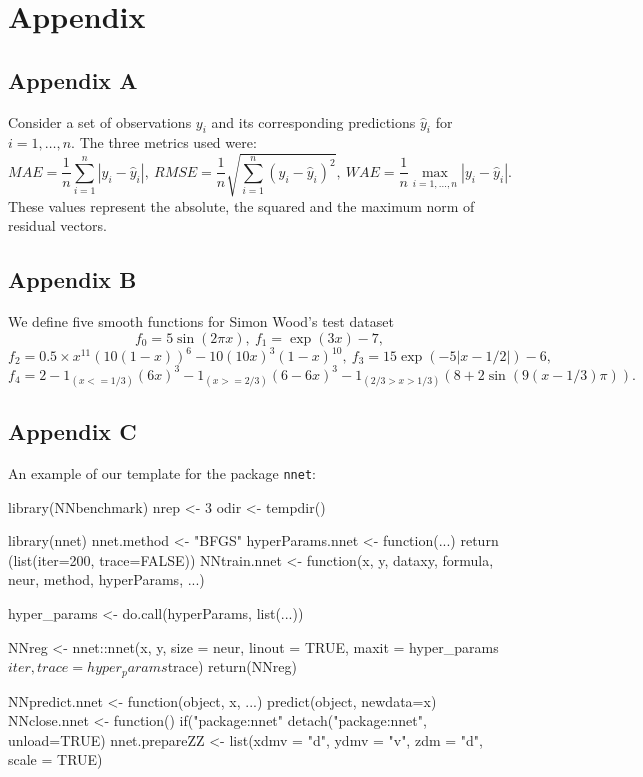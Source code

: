 

\hypertarget{appendix}{%
\section{Appendix}\label{appendix}}

\hypertarget{appendix-a}{%
\subsection{Appendix A}\label{appendix-a}}

Consider a set of observations \(y_i\) and its corresponding predictions
\(\hat y_i\) for \(i=1,\dots,n\). The three metrics used were: \[
MAE = \frac1n\sum_{i=1}^n|y_i - \hat y_i|,~
RMSE = \frac1n\sqrt{\sum_{i=1}^n(y_i - \hat y_i)^2},~
WAE = \frac1n\max_{i=1,\dots,n}|y_i - \hat y_i|.
\] These values represent the absolute, the squared and the maximum norm
of residual vectors.

\hypertarget{appendix-b}{%
\subsection{Appendix B}\label{appendix-b}}

We define five smooth functions for Simon Wood's test dataset \[
f_0=5\sin(2\pi x),~
f_1=\exp(3x)-7,
\] \[
f_2=0.5\times x^{11}(10(1 - x))^6 - 10 (10x)^3(1 - x)^{10},~
f_3=15 \exp(-5 |x-1/2|)-6,
\] \[
f_4=2-1_{(x <= 1/3)}(6x)^3 - 1_{(x >= 2/3)} (6-6x)^3 - 
1_{(2/3 > x > 1/3)}(8+2\sin(9(x-1/3)\pi)).
\]

\hypertarget{appendix-c}{%
\subsection{Appendix C}\label{appendix-c}}

An example of our template for the package \texttt{nnet}:

\begin{Schunk}
\begin{Sinput}
library(NNbenchmark)
nrep <- 3       
odir <- tempdir()

library(nnet)
nnet.method <- "BFGS"
hyperParams.nnet <- function(...) {
    return (list(iter=200, trace=FALSE))
}
NNtrain.nnet <- function(x, y, dataxy, formula, neur, method, hyperParams, ...) {
    
    hyper_params <- do.call(hyperParams, list(...))
    
    NNreg <- nnet::nnet(x, y, size = neur, linout = TRUE, 
                        maxit = hyper_params$iter, trace=hyper_params$trace)
    return(NNreg)
}
NNpredict.nnet  <- function(object, x, ...) { predict(object, newdata=x) }
NNclose.nnet    <- function() {  if("package:nnet" %
                                detach("package:nnet", unload=TRUE) }
nnet.prepareZZ  <- list(xdmv = "d", ydmv = "v", zdm = "d", scale = TRUE)
\end{Sinput}
\end{Schunk}

